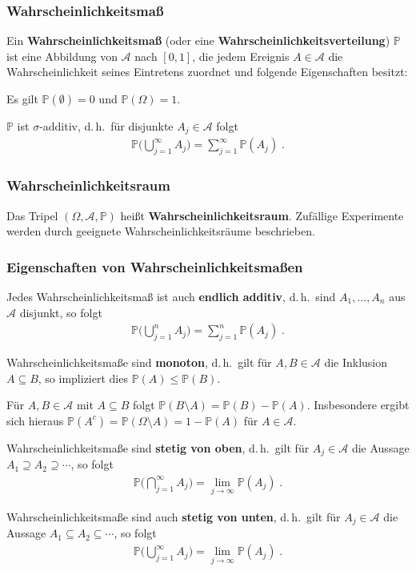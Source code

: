 \documentclass[ngerman,draft,parskip=half,twoside]{scrartcl}
\newcommand*{\Algeb}{\mathcal{A}}   %
\newcommand*{\WKM}{\mathbb{P}}      %
\begin{document}
\subsubsection{Wahrscheinlichkeitsmaß}
Ein \textbf{Wahrscheinlichkeitsmaß} (oder eine \textbf{Wahrscheinlichkeitsverteilung})
 $\WKM$ ist eine Abbildung von
$\Algeb$ nach $[0,1]$, die jedem Ereignis $A\in \Algeb$ die Wahrscheinlichkeit seines
Eintretens zuordnet und folgende Eigenschaften besitzt:
\begin{eigenschaften}
 \item Es gilt $\WKM(\emptyset)=0$ und $\WKM(\Omega)=1$.
 \item $\WKM$ ist $\sigma$-additiv, d.\,h.~für disjunkte $A_j\in\Algeb$ folgt
  \begin{gather*}
    \WKM\Big(\bigcup_{j=1}^\infty A_j\Big)=\sum_{j=1}^\infty\WKM(A_j)\;.
  \end{gather*}
\end{eigenschaften}
\subsubsection{Wahrscheinlichkeitsraum}
Das Tripel $(\Omega,\Algeb,\WKM)$ heißt \textbf{Wahrscheinlichkeitsraum}. Zufällige
Experimente werden durch geeignete Wahrscheinlichkeitsräume  beschrieben.
\subsubsection{Eigenschaften von Wahrscheinlichkeitsmaßen}
\begin{eigenschaften}
 \item
Jedes Wahrscheinlichkeitsmaß ist auch \textbf{endlich additiv}, d.\,h.~sind
$A_1,\ldots,A_n$ aus $\Algeb$ disjunkt, so folgt
 \begin{gather*}
   \WKM\Big(\bigcup_{j=1}^n A_j\Big)=\sum_{j=1}^n\WKM(A_j)\;.
 \end{gather*}
 \item
Wahrscheinlichkeitsmaße sind \textbf{monoton}, d.\,h.~gilt für $A,B\in\Algeb$ die Inklusion
$A\subseteq B$, so impliziert dies $\WKM(A)\le\WKM(B)$.
 \item
Für $A,B\in\Algeb$ mit $A\subseteq B$ folgt $\WKM(B\setminus A)=\WKM(B)-\WKM(A)$. Insbesondere ergibt sich hieraus
$\WKM(A^c)=\WKM(\Omega\setminus A)=1-\WKM(A)$ für $A\in\Algeb$.
 \item
Wahrscheinlichkeitsmaße sind \textbf{stetig von oben}, d.\,h.~gilt für $A_j\in\Algeb$
die Aussage $A_1\supseteq A_2\supseteq\cdots$,
so folgt
 \begin{gather*}
   \WKM\Big(\bigcap_{j=1}^\infty A_j\Big)=\lim_{j\to\infty}\WKM(A_j)\;.
 \end{gather*}
 \item
Wahrscheinlichkeitsmaße sind auch \textbf{stetig von unten}, d.\,h.~gilt für $A_j\in\Algeb$
die Aussage $A_1\subseteq A_2\subseteq\cdots$,
so folgt
  \begin{gather*}
    \WKM\Big(\bigcup_{j=1}^\infty A_j\Big)=\lim_{j\to\infty}\WKM(A_j)\;.
  \end{gather*}
\end{eigenschaften}
\end{document}
